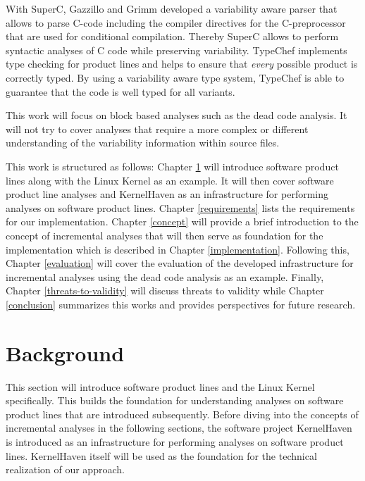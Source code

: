 \documentclass[a4paper]{article}
\begin{document}
With SuperC, Gazzillo and Grimm \cite{gazzillo-grimm} developed a variability aware parser that allows to parse C-code including the compiler directives for the C-preprocessor that are used for conditional compilation. Thereby SuperC allows to perform syntactic analyses of C code while preserving variability. 
TypeChef \cite{Kenner:2010:TTT:1868688.1868693} implements type checking for product lines and helps to ensure that \emph{every} possible product is correctly typed.  By using a variability aware type system, TypeChef is able to guarantee that the code is well typed for all variants.

This work will focus on block based analyses such as the dead code analysis. It will not try to cover analyses that require a more complex or different understanding of the variability information within source files.

This work is structured as follows: Chapter \ref{background} will introduce software product lines along with the Linux Kernel as an example. It will then cover software product line analyses and KernelHaven as an infrastructure for performing analyses on software product lines. Chapter \ref{requirements} lists the requirements for our implementation. Chapter \ref{concept} will provide a brief introduction to the concept of incremental analyses that will then serve as foundation for the implementation which is described in Chapter \ref{implementation}. Following this, Chapter \ref{evaluation} will cover the evaluation of the developed infrastructure for incremental analyses using the dead code analysis as an example. Finally, Chapter \ref{threats-to-validity} will discuss threats to validity while Chapter \ref{conclusion} summarizes this works and provides perspectives for future research.

\clearpage
\section{Background} \label{background}

This section will introduce software product lines and the Linux Kernel specifically. This builds the foundation for understanding analyses on software product lines that are introduced subsequently. Before diving into the concepts of incremental analyses in the following sections, the software project KernelHaven is introduced as an infrastructure for performing analyses on software product lines. KernelHaven itself will be used as the foundation for the technical realization of our approach.
\end{document}
